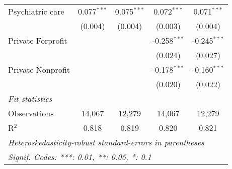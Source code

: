 \begin{tabular}{lcccc}
   Psychiatric care        & 0.077$^{***}$ & 0.075$^{***}$ & 0.072$^{***}$  & 0.071$^{***}$\\   
                           & (0.004)       & (0.004)       & (0.003)        & (0.004)\\   
   Private Forprofit       &               &               & -0.258$^{***}$ & -0.245$^{***}$\\   
                           &               &               & (0.024)        & (0.027)\\   
   Private Nonprofit       &               &               & -0.178$^{***}$ & -0.160$^{***}$\\   
                           &               &               & (0.020)        & (0.022)\\   
   \midrule
   \emph{Fit statistics}\\
   Observations            & 14,067        & 12,279        & 14,067         & 12,279\\  
   R$^2$                   & 0.818         & 0.819         & 0.820          & 0.821\\  
   \midrule \midrule
   \multicolumn{5}{l}{\emph{Heteroskedasticity-robust standard-errors in parentheses}}\\
   \multicolumn{5}{l}{\emph{Signif. Codes: ***: 0.01, **: 0.05, *: 0.1}}\\
\end{tabular}
\par\endgroup


